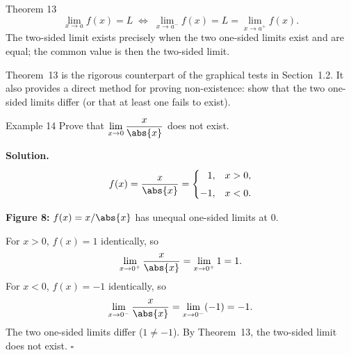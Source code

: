 \begin{theorembox}{Theorem 13}
\[
\lim_{x \to a} f(x) = L
\;\iff\;
\lim_{x \to a^{-}} f(x) = L = \lim_{x \to a^{+}} f(x).
\]
The two-sided limit exists precisely when the two one-sided limits exist and are equal; the common value is then the two-sided limit.
\end{theorembox}

\noindent
Theorem~13 is the rigorous counterpart of the graphical tests in Section~1.2. It also provides a direct method for proving non-existence: show that the two one-sided limits differ (or that at least one fails to exist).

\begin{examplebox}{Example 14}
Prove that \(\displaystyle\lim_{x \to 0} \frac{x}{\abs{x}}\) does not exist.

\medskip
\textbf{Solution.}
\[
f(x) = \frac{x}{\abs{x}} =
\begin{cases}
\phantom{-}1, & x > 0, \\[4pt]
-1, & x < 0.
\end{cases}
\]

\begin{center}

\smallskip
\textbf{Figure 8:} \(f(x) = x/\abs{x}\) has unequal one-sided limits at \(0\).
\end{center}

For \(x > 0\), \(f(x) = 1\) identically, so
\[
\lim_{x \to 0^{+}} \frac{x}{\abs{x}} = \lim_{x \to 0^{+}} 1 = 1.
\]
For \(x < 0\), \(f(x) = -1\) identically, so
\[
\lim_{x \to 0^{-}} \frac{x}{\abs{x}} = \lim_{x \to 0^{-}} (-1) = -1.
\]
The two one-sided limits differ (\(1 \neq -1\)). By Theorem~13, the two-sided limit does not exist. \(\square\)
\end{examplebox}

